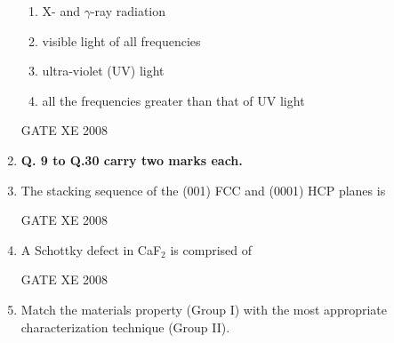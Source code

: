 \documentclass[12pt]{article}
\begin{document}
\begin{enumerate}
\begin{enumerate}
\item  X- and $\gamma$-ray radiation  
\item  visible light of all frequencies  
\item  ultra-violet (UV) light  
\item  all the frequencies greater than that of UV light 
\end{enumerate}    

    GATE XE 2008  

\item[] \textbf{Q. 9 to Q.30 carry two marks each.}
\item The stacking sequence of the (001) FCC and (0001) HCP planes is  

\begin{enumerate}
\end{enumerate}

GATE XE 2008

\item A Schottky defect in CaF$_2$ is comprised of  

\begin{enumerate}
\end{enumerate}

GATE XE 2008

\item Match the materials property (Group I) with the most appropriate characterization technique (Group II).  


\end{enumerate}
\end{document}
